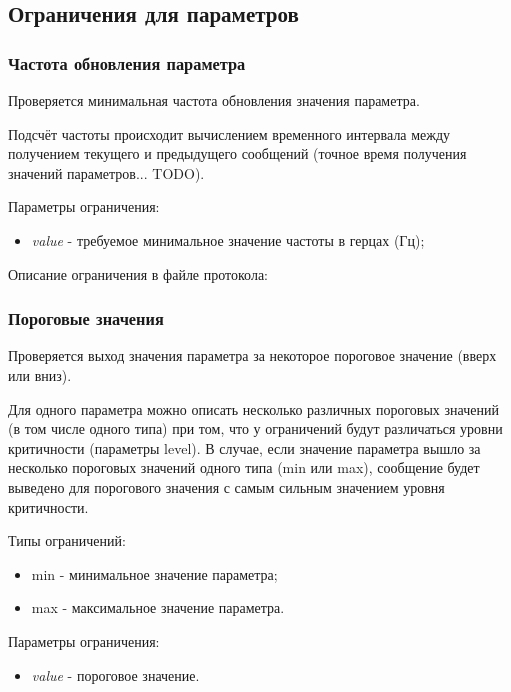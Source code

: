 \subsection{Ограничения для параметров}

\subsubsection{Частота обновления параметра}

Проверяется минимальная частота обновления значения параметра.

Подсчёт частоты происходит вычислением временного интервала между получением 
текущего и предыдущего сообщений (точное время получения значений 
параметров... TODO).

Параметры ограничения:

\begin{itemize}
 \item \textit{value} - требуемое минимальное значение частоты в герцах (Гц);
\end{itemize}

Описание ограничения в файле протокола:



\subsubsection{Пороговые значения}

Проверяется выход значения параметра за некоторое пороговое значение (вверх или 
вниз).

Для одного параметра можно описать несколько различных пороговых значений (в 
том числе одного типа) при том, что у ограничений будут различаться уровни 
критичности (параметры level). В случае, если значение параметра вышло за 
несколько пороговых значений одного типа (min или max), сообщение будет 
выведено для порогового значения с самым сильным значением уровня критичности.

Типы ограничений:

\begin{itemize}
 \item min - минимальное значение параметра;
 \item max - максимальное значение параметра.
\end{itemize}

Параметры ограничения:

\begin{itemize}
 \item \textit{value} - пороговое значение.
\end{itemize}

